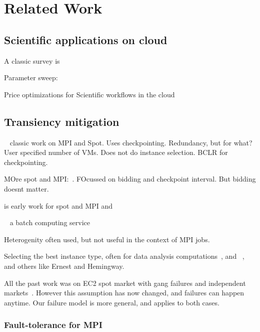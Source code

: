 \section{Related Work}

\subsection{Scientific applications on cloud}

A classic survey is ~\cite{iosup_performance_2011}
~\cite{zhai_cloud_2011}

Parameter sweep:~\cite{casanova_heuristics_2000}

Price optimizations for Scientific workflows in the cloud~\cite{gari_learning_2019}



\subsection{Transiency mitigation}

~\cite{marathe2014exploiting} classic work on MPI and Spot.
Uses checkpointing.
Redundancy, but for what?
User specified number of VMs. Does not do instance selection. 
BCLR for checkpointing.



MOre spot and MPI:~\cite{gong_monetary_2015}. FOcussed on bidding and checkpoint interval. But bidding doesnt matter. 


\cite{xiang_spotmpi:_2011} is early work for spot and MPI and 

~\cite{spoton} a batch computing service

Heterogenity often used, but not useful in the context of MPI jobs. 
~\cite{exosphere}

Selecting the best instance type, often for data analysis computations~\cite{alipourfard_cherrypick}, and ~\cite{yadwadkar_selecting_2017}, and others like Ernest and Hemingway.


All the past work was on EC2 spot market with gang failures and independent markets~\cite{marathe2014exploiting, gong_monetary_2015}.
However this assumption has now changed, and failures can happen anytime.
Our failure model is more general, and applies to both cases.




\subsubsection{Fault-tolerance for MPI}

